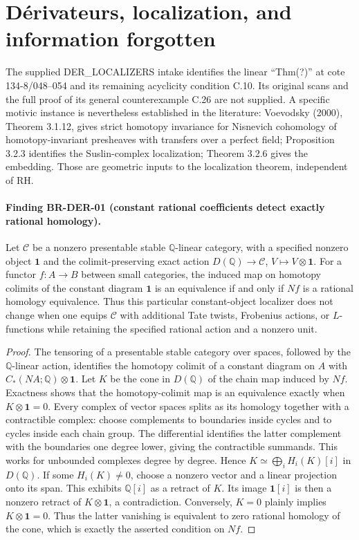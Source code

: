 \documentclass[11pt,a4paper]{article}
\theoremstyle{definition}\newtheorem{definition}[theorem]{Definition}
\theoremstyle{remark}\newtheorem{remark}[theorem]{Remark}
\begin{document}
\section{D\'erivateurs, localization, and information forgotten}
\label{sec:root-derivators}

The supplied DER\_LOCALIZERS intake identifies the linear
``Thm(?)'' at cote 134-8/048--054 and its remaining acyclicity
condition C.10.  Its original scans and the full proof of its
general counterexample C.26 are not supplied.  A specific motivic
instance is nevertheless established in the literature:
Voevodsky (2000), Theorem 3.1.12, gives strict homotopy invariance
for Nisnevich cohomology of homotopy-invariant presheaves with
transfers over a perfect field; Proposition 3.2.3 identifies the
Suslin-complex localization; Theorem 3.2.6 gives the embedding.
Those are geometric inputs to the localization theorem, independent
of RH.

\paragraph{Finding BR-DER-01 (constant rational coefficients detect exactly
rational homology).}
Let $\mathcal C$ be a nonzero presentable stable
$\mathbb Q$-linear category, with a specified nonzero object
$\mathbf1$ and the colimit-preserving exact action
$D(\mathbb Q)\to\mathcal C$, $V\mapsto V\otimes\mathbf1$.
For a functor $f:A\to B$ between small categories, the induced map
on homotopy colimits of the constant diagram $\mathbf1$ is an
equivalence if and only if $Nf$ is a rational homology equivalence.
Thus this particular constant-object localizer does not change
when one equips $\mathcal C$ with additional Tate twists,
Frobenius actions, or $L$-functions while retaining the specified
rational action and a nonzero unit.

\begin{proof}
The tensoring of a presentable stable category over spaces, followed
by the $\mathbb Q$-linear action, identifies the homotopy colimit
of a constant diagram on $A$ with
$C_*(NA;\mathbb Q)\otimes\mathbf1$.  Let $K$ be the cone in
$D(\mathbb Q)$ of the chain map induced by $Nf$.  Exactness shows
that the homotopy-colimit map is an equivalence exactly when
$K\otimes\mathbf1=0$.
Every complex of vector spaces splits as its homology together
with a contractible complex: choose complements to boundaries
inside cycles and to cycles inside each chain group.  The
differential identifies the latter complement with the
boundaries one degree lower, giving the contractible summands.
This works for unbounded complexes degree by degree.  Hence
$K\simeq\bigoplus_i H_i(K)[i]$ in $D(\mathbb Q)$.
If some $H_i(K)\ne0$, choose a nonzero vector and a linear
projection onto its span.  This exhibits $\mathbb Q[i]$ as a
retract of $K$.  Its image $\mathbf1[i]$ is then a nonzero
retract of $K\otimes\mathbf1$, a contradiction.  Conversely,
$K=0$ plainly implies $K\otimes\mathbf1=0$.
Thus the latter vanishing is equivalent to zero rational homology
of the cone, which is exactly the asserted condition on $Nf$.
\end{proof}
\end{document}
